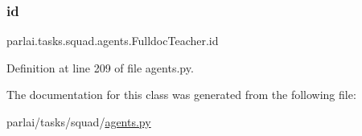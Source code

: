 \subsubsection{\texorpdfstring{id}{id}}
{\footnotesize\ttfamily parlai.\+tasks.\+squad.\+agents.\+Fulldoc\+Teacher.\+id}



Definition at line 209 of file agents.\+py.



The documentation for this class was generated from the following file\+:\begin{DoxyCompactItemize}
\item 
parlai/tasks/squad/\hyperlink{parlai_2tasks_2squad_2agents_8py}{agents.\+py}\end{DoxyCompactItemize}
